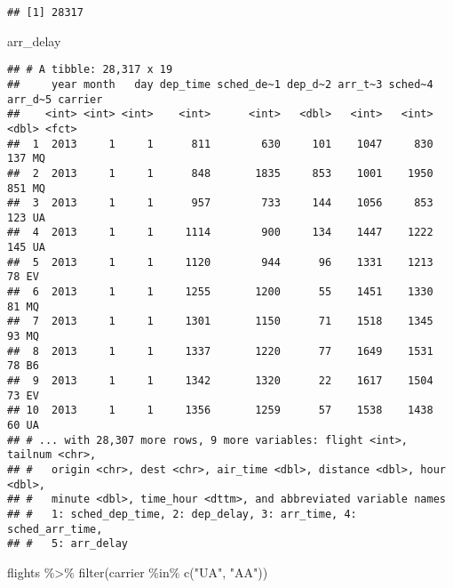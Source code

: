 \documentclass[
]{article}
\newenvironment{Shaded}{\begin{snugshade}}{\end{snugshade}}
\newcommand{\FunctionTok}[1]{\textcolor[rgb]{0.00,0.00,0.00}{#1}}
\newcommand{\NormalTok}[1]{#1}
\newcommand{\SpecialCharTok}[1]{\textcolor[rgb]{0.00,0.00,0.00}{#1}}
\newcommand{\StringTok}[1]{\textcolor[rgb]{0.31,0.60,0.02}{#1}}
\begin{document}
\begin{verbatim}
## [1] 28317
\end{verbatim}

\begin{Shaded}
\begin{Highlighting}[]
\NormalTok{  arr\_delay}
\end{Highlighting}
\end{Shaded}

\begin{verbatim}
## # A tibble: 28,317 x 19
##     year month   day dep_time sched_de~1 dep_d~2 arr_t~3 sched~4 arr_d~5 carrier
##    <int> <int> <int>    <int>      <int>   <dbl>   <int>   <int>   <dbl> <fct>  
##  1  2013     1     1      811        630     101    1047     830     137 MQ     
##  2  2013     1     1      848       1835     853    1001    1950     851 MQ     
##  3  2013     1     1      957        733     144    1056     853     123 UA     
##  4  2013     1     1     1114        900     134    1447    1222     145 UA     
##  5  2013     1     1     1120        944      96    1331    1213      78 EV     
##  6  2013     1     1     1255       1200      55    1451    1330      81 MQ     
##  7  2013     1     1     1301       1150      71    1518    1345      93 MQ     
##  8  2013     1     1     1337       1220      77    1649    1531      78 B6     
##  9  2013     1     1     1342       1320      22    1617    1504      73 EV     
## 10  2013     1     1     1356       1259      57    1538    1438      60 UA     
## # ... with 28,307 more rows, 9 more variables: flight <int>, tailnum <chr>,
## #   origin <chr>, dest <chr>, air_time <dbl>, distance <dbl>, hour <dbl>,
## #   minute <dbl>, time_hour <dttm>, and abbreviated variable names
## #   1: sched_dep_time, 2: dep_delay, 3: arr_time, 4: sched_arr_time,
## #   5: arr_delay
\end{verbatim}

\begin{Shaded}
\begin{Highlighting}[]
\NormalTok{  flights }\SpecialCharTok{\%\textgreater{}\%}
      \FunctionTok{filter}\NormalTok{(carrier }\SpecialCharTok{\%in\%} \FunctionTok{c}\NormalTok{(}\StringTok{"UA"}\NormalTok{, }\StringTok{"AA"}\NormalTok{))}
\end{Highlighting}
\end{Shaded}
\end{document}

